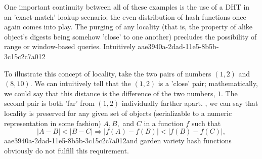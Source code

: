 \documentclass[12pt]{article}
\begin{document}
\par One important continuity between all of these examples is the use of a DHT in an 'exact-match' lookup scenario; the even distribution of hash functions once again comes into play. The purging of any locality (that is, the property of alike object's digests being somehow 'close' to one another) precludes the possibility of range or window-based queries. Intuitively
aae3940a-2dad-11e5-8b5b-3c15c2c7a012
\par To illustrate this concept of locality, take the two pairs of numbers $(1,2)$ and $(8,10)$. We can intuitively tell that the $(1,2)$ is a 'close' pair; mathematically, we could say that this distance is the difference of the two numbers, $1$. The second pair is both 'far' from $(1,2)$ individually farther apart. , we can say that locality is preserved for any given set of objects (serializable to a numeric representation in some fashion) $A,B,$ and $C$ in a function $f$ such that
\begin{equation}
|A-B| < |B-C| \Rightarrow |f(A)-f(B)| < |f(B) - f(C)|,
\end{equation}
aae3940a-2dad-11e5-8b5b-3c15c2c7a012and garden variety hash functions obviously do not fulfill this requirement.

\printbibliography
\end{document}
